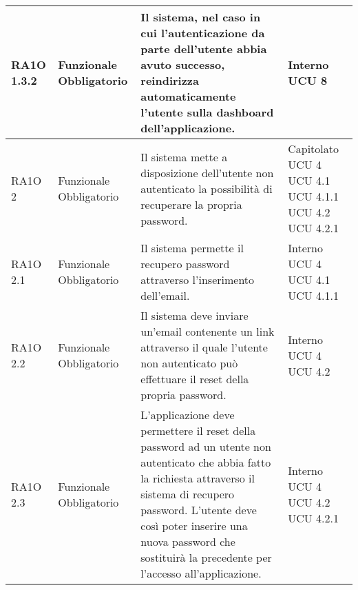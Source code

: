 \begin{center}
\begin{longtable}{ | l | p{2cm} | p{5cm} | p{1.7cm} |}
				RA1O 1.3.2 & Funzionale \newline  Obbligatorio  & Il sistema, nel caso in cui l'autenticazione da parte dell'utente abbia avuto successo, reindirizza automaticamente l'utente sulla dashboard dell'applicazione.
 &  Interno \newline  UCU 8 \newline  \\ \hline      
				RA1O 2 & Funzionale \newline  Obbligatorio  & Il sistema mette a disposizione dell'utente non autenticato la possibilità  di recuperare la propria password. &  Capitolato \newline  UCU 4 \newline  UCU 4.1 \newline  UCU 4.1.1 \newline  UCU 4.2 \newline  UCU 4.2.1 \newline  \\ \hline      
				RA1O 2.1 & Funzionale \newline  Obbligatorio  & Il sistema permette il recupero password attraverso l'inserimento dell'email. &  Interno \newline  UCU 4 \newline  UCU 4.1 \newline  UCU 4.1.1 \newline  \\ \hline      
				RA1O 2.2 & Funzionale \newline  Obbligatorio  & Il sistema deve inviare un'email contenente un link attraverso il quale l'utente non autenticato può effettuare il reset della propria password. &  Interno \newline  UCU 4 \newline  UCU 4.2 \newline  \\ \hline      
				RA1O 2.3 & Funzionale \newline  Obbligatorio  & L'applicazione \glossario{MaaP} deve permettere il reset della password ad un utente non autenticato che abbia fatto la richiesta attraverso il sistema di recupero password. L'utente deve così poter inserire una nuova password che sostituirà la precedente per l'accesso all'applicazione. &  Interno \newline  UCU 4 \newline  UCU 4.2 \newline  UCU 4.2.1 \newline  \\ \hline      

\end{longtable}
\end{center}
